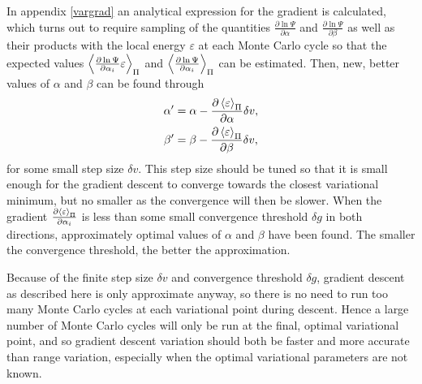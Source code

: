 \documentclass[a4paper,8pt]{article}
\begin{document}
\begin{multicols}{2}
In appendix \ref{vargrad} an analytical expression for the gradient is calculated, which turns out to require sampling of the quantities $\frac{\partial\ln\Psi}{\partial\alpha}$ and $\frac{\partial\ln\Psi}{\partial\beta}$ as well as their products with the local energy $\varepsilon$ at each Monte Carlo cycle so that the expected values $\ev{\frac{\partial\ln\Psi}{\partial\alpha_i}\varepsilon}_\Pi$ and $\ev{\frac{\partial\ln\Psi}{\partial\alpha_i}}_\Pi$ can be estimated. Then, new, better values of $\alpha$ and $\beta$ can be found through
\begin{align}
\alpha' &= \alpha-\frac{\partial\ev{\varepsilon}_\Pi}{\partial\alpha}\delta v, \\
\beta' &= \beta-\frac{\partial\ev{\varepsilon}_\Pi}{\partial\beta}\delta v,
\end{align}
for some small step size $\delta v$. This step size should be tuned so that it is small enough for the gradient descent to converge towards the closest variational minimum, but no smaller as the convergence will then be slower. When the gradient $\frac{\partial\ev{\varepsilon}_\Pi}{\partial\alpha_i}$ is less than some small convergence threshold $\delta g$ in both directions, approximately optimal values of $\alpha$ and $\beta$ have been found. The smaller the convergence threshold, the better the approximation.

Because of the finite step size $\delta v$ and convergence threshold $\delta g$, gradient descent as described here is only approximate anyway, so there is no need to run too many Monte Carlo cycles at each variational point during descent. Hence a large number of Monte Carlo cycles will only be run at the final, optimal variational point, and so gradient descent variation should both be faster and more accurate than range variation, especially when the optimal variational parameters are not known.


\end{multicols}
\end{document}
